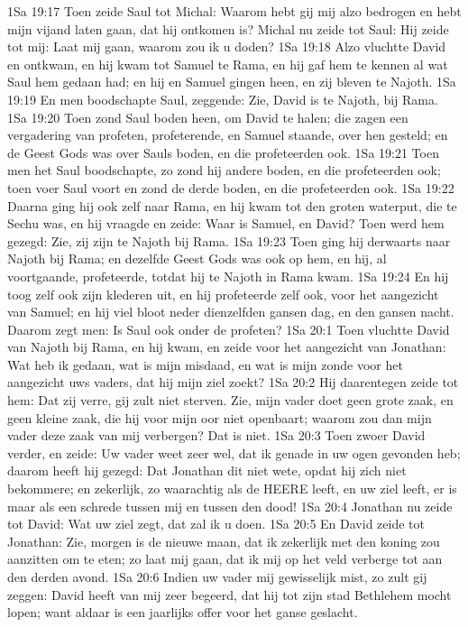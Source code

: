 1Sa 19:17  Toen zeide Saul tot Michal: Waarom hebt gij mij alzo bedrogen en hebt mijn vijand laten gaan, dat hij ontkomen is? Michal nu zeide tot Saul: Hij zeide tot mij: Laat mij gaan, waarom zou ik u doden?
1Sa 19:18  Alzo vluchtte David en ontkwam, en hij kwam tot Samuel te Rama, en hij gaf hem te kennen al wat Saul hem gedaan had; en hij en Samuel gingen heen, en zij bleven te Najoth.
1Sa 19:19  En men boodschapte Saul, zeggende: Zie, David is te Najoth, bij Rama.
1Sa 19:20  Toen zond Saul boden heen, om David te halen; die zagen een vergadering van profeten, profeterende, en Samuel staande, over hen gesteld; en de Geest Gods was over Sauls boden, en die profeteerden ook.
1Sa 19:21  Toen men het Saul boodschapte, zo zond hij andere boden, en die profeteerden ook; toen voer Saul voort en zond de derde boden, en die profeteerden ook.
1Sa 19:22  Daarna ging hij ook zelf naar Rama, en hij kwam tot den groten waterput, die te Sechu was, en hij vraagde en zeide: Waar is Samuel, en David? Toen werd hem gezegd: Zie, zij zijn te Najoth bij Rama.
1Sa 19:23  Toen ging hij derwaarts naar Najoth bij Rama; en dezelfde Geest Gods was ook op hem, en hij, al voortgaande, profeteerde, totdat hij te Najoth in Rama kwam.
1Sa 19:24  En hij toog zelf ook zijn klederen uit, en hij profeteerde zelf ook, voor het aangezicht van Samuel; en hij viel bloot neder dienzelfden gansen dag, en den gansen nacht. Daarom zegt men: Is Saul ook onder de profeten?
1Sa 20:1  Toen vluchtte David van Najoth bij Rama, en hij kwam, en zeide voor het aangezicht van Jonathan: Wat heb ik gedaan, wat is mijn misdaad, en wat is mijn zonde voor het aangezicht uws vaders, dat hij mijn ziel zoekt?
1Sa 20:2  Hij daarentegen zeide tot hem: Dat zij verre, gij zult niet sterven. Zie, mijn vader doet geen grote zaak, en geen kleine zaak, die hij voor mijn oor niet openbaart; waarom zou dan mijn vader deze zaak van mij verbergen? Dat is niet.
1Sa 20:3  Toen zwoer David verder, en zeide: Uw vader weet zeer wel, dat ik genade in uw ogen gevonden heb; daarom heeft hij gezegd: Dat Jonathan dit niet wete, opdat hij zich niet bekommere; en zekerlijk, zo waarachtig als de HEERE leeft, en uw ziel leeft, er is maar als een schrede tussen mij en tussen den dood!
1Sa 20:4  Jonathan nu zeide tot David: Wat uw ziel zegt, dat zal ik u doen.
1Sa 20:5  En David zeide tot Jonathan: Zie, morgen is de nieuwe maan, dat ik zekerlijk met den koning zou aanzitten om te eten; zo laat mij gaan, dat ik mij op het veld verberge tot aan den derden avond.
1Sa 20:6  Indien uw vader mij gewisselijk mist, zo zult gij zeggen: David heeft van mij zeer begeerd, dat hij tot zijn stad Bethlehem mocht lopen; want aldaar is een jaarlijks offer voor het ganse geslacht.
